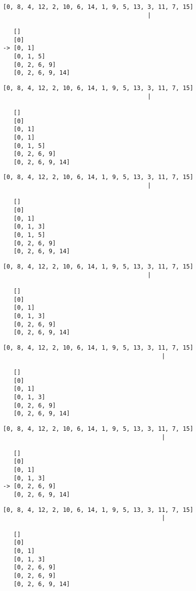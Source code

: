 { \begin{verbatim}
[0, 8, 4, 12, 2, 10, 6, 14, 1, 9, 5, 13, 3, 11, 7, 15]
                                         |

   []
   [0]
-> [0, 1]
   [0, 1, 5]
   [0, 2, 6, 9]
   [0, 2, 6, 9, 14]

\end{verbatim} }

{ \begin{verbatim}
[0, 8, 4, 12, 2, 10, 6, 14, 1, 9, 5, 13, 3, 11, 7, 15]
                                         |

   []
   [0]
   [0, 1]
   [0, 1]
   [0, 1, 5]
   [0, 2, 6, 9]
   [0, 2, 6, 9, 14]
\end{verbatim} }

{ \begin{verbatim}
[0, 8, 4, 12, 2, 10, 6, 14, 1, 9, 5, 13, 3, 11, 7, 15]
                                         |

   []
   [0]
   [0, 1]
   [0, 1, 3]
   [0, 1, 5]
   [0, 2, 6, 9]
   [0, 2, 6, 9, 14]
\end{verbatim} }

{ \begin{verbatim}
[0, 8, 4, 12, 2, 10, 6, 14, 1, 9, 5, 13, 3, 11, 7, 15]
                                         |

   []
   [0]
   [0, 1]
   [0, 1, 3]
   [0, 2, 6, 9]
   [0, 2, 6, 9, 14]

\end{verbatim} }

{ \begin{verbatim}
[0, 8, 4, 12, 2, 10, 6, 14, 1, 9, 5, 13, 3, 11, 7, 15]
                                             |

   []
   [0]
   [0, 1]
   [0, 1, 3]
   [0, 2, 6, 9]
   [0, 2, 6, 9, 14]

\end{verbatim} }

{ \begin{verbatim}
[0, 8, 4, 12, 2, 10, 6, 14, 1, 9, 5, 13, 3, 11, 7, 15]
                                             |

   []
   [0]
   [0, 1]
   [0, 1, 3]
-> [0, 2, 6, 9]
   [0, 2, 6, 9, 14]

\end{verbatim} }

{ \begin{verbatim}
[0, 8, 4, 12, 2, 10, 6, 14, 1, 9, 5, 13, 3, 11, 7, 15]
                                             |

   []
   [0]
   [0, 1]
   [0, 1, 3]
   [0, 2, 6, 9]
   [0, 2, 6, 9]
   [0, 2, 6, 9, 14]
\end{verbatim} }

